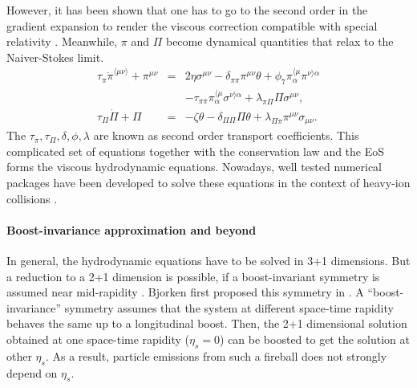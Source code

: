 However, it has been shown that one has to go to the second order in the gradient expansion to render the viscous correction compatible with special relativity \cite{ISRAEL1976310}.
Meanwhile, $\pi$ and $\Pi$ become dynamical quantities that relax to the Naiver-Stokes limit.
\begin{eqnarray}
\tau_\pi \dot{\pi}^{\langle\mu\nu\rangle}+\pi^{\mu\nu} &=& 2\eta\sigma^{\mu\nu}- \delta_{\pi\pi}\pi^{\mu\nu}\theta + \phi_7 \pi_{\alpha}^{\langle\mu}\pi^{\nu\rangle\alpha}\\ 
\nonumber
&& -\tau_{\pi\pi}\pi_{\alpha}^{\langle\mu}\sigma^{\nu\rangle\alpha} + \lambda_{\pi\Pi}\Pi\sigma^{\mu\nu},
\\
\tau_{\Pi}\dot{\Pi} + \Pi &=& -\zeta\theta - \delta_{\Pi\Pi}\Pi\theta + \lambda_{\Pi\pi}\pi^{\mu\nu}\sigma_{\mu\nu}.
\end{eqnarray}
The $\tau_\pi, \tau_\Pi, \delta, \phi, \lambda$ are known as second order transport coefficients.
This complicated set of equations together with the conservation law and the EoS forms the viscous hydrodynamic equations.
Nowadays, well tested numerical packages have been developed to solve these equations in the context of heavy-ion collisions \cite{Song:2007ux,Shen:2014vra,Schenke:2010nt,Karpenko:2013wva}.

\paragraph{Boost-invariance approximation and beyond}
In general, the hydrodynamic equations have to be solved in 3+1 dimensions.
But a reduction to a 2+1 dimension is possible, if a boost-invariant symmetry is assumed near mid-rapidity \cite{Miller:2007ri, Drescher:2006ca, Schenke:2012wb, Niemi:2015qia, Moreland:2014oya, Chatterjee:2015aja}.
Bjorken first proposed this symmetry in \cite{PhysRevD.27.140}.
A ``boost-invariance'' symmetry assumes that the system at different space-time rapidity behaves the same up to a longitudinal boost.
Then, the 2+1 dimensional solution obtained at one space-time rapidity ($\eta_s = 0$) can be boosted to get the solution at other $\eta_s$.
As a result, particle emissions from such a fireball does not strongly depend on $\eta_s$.

